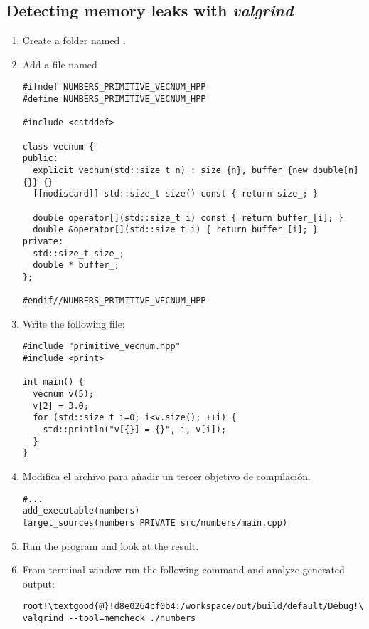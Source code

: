 \subsection{Detecting memory leaks with \emph{valgrind}}

\begin{enumerate}

\item
Create a folder named .

\item 
Add a file named

\begin{lstlisting}
#ifndef NUMBERS_PRIMITIVE_VECNUM_HPP
#define NUMBERS_PRIMITIVE_VECNUM_HPP

#include <cstddef>

class vecnum {
public:
  explicit vecnum(std::size_t n) : size_{n}, buffer_{new double[n]{}} {}
  [[nodiscard]] std::size_t size() const { return size_; }

  double operator[](std::size_t i) const { return buffer_[i]; }
  double &operator[](std::size_t i) { return buffer_[i]; }
private:
  std::size_t size_;
  double * buffer_;
};

#endif//NUMBERS_PRIMITIVE_VECNUM_HPP
\end{lstlisting}

\item
Write the following 
 file:

\begin{lstlisting}
#include "primitive_vecnum.hpp"
#include <print>

int main() {
  vecnum v(5);
  v[2] = 3.0;
  for (std::size_t i=0; i<v.size(); ++i) {
    std::println("v[{}] = {}", i, v[i]);
  }
}
\end{lstlisting}

\item Modifica el archivo  para añadir un tercer
objetivo de compilación.

\begin{lstlisting}
#...
add_executable(numbers)
target_sources(numbers PRIVATE src/numbers/main.cpp)
\end{lstlisting}

\item
Run the program and look at the result.

\item
From terminal window run the following command and analyze generated output:

\begin{lstlisting}[style=terminal,escapechar=!]
root!\textgood{@}!d8e0264cf0b4:/workspace/out/build/default/Debug!\textgood{\#}! valgrind --tool=memcheck ./numbers
\end{lstlisting}

\end{enumerate}
